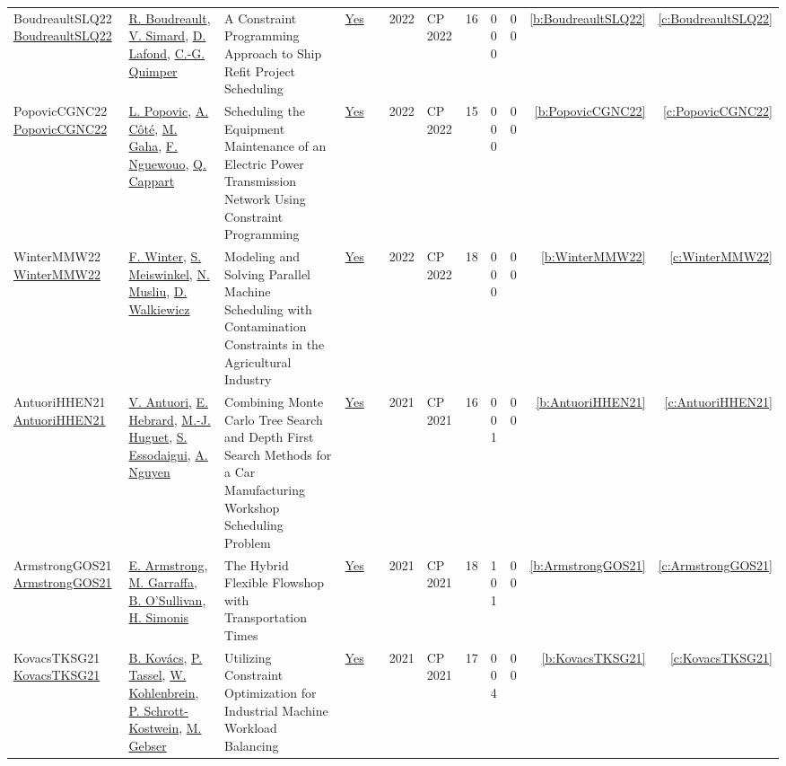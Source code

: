 {\begin{longtable}{>{\raggedright\arraybackslash}p{3cm}>{\raggedright\arraybackslash}p{4.5cm}>{\raggedright\arraybackslash}p{6.0cm}rrrp{2.5cm}rp{1cm}p{1cm}rr}
BoudreaultSLQ22 \href{https://doi.org/10.4230/LIPIcs.CP.2022.10}{BoudreaultSLQ22} & \hyperref[auth:a34]{R. Boudreault}, \hyperref[auth:a35]{V. Simard}, \hyperref[auth:a36]{D. Lafond}, \hyperref[auth:a37]{C.-G. Quimper} & A Constraint Programming Approach to Ship Refit Project Scheduling & \href{../works/BoudreaultSLQ22.pdf}{Yes} & \cite{BoudreaultSLQ22} & 2022 & CP 2022 & 16 & 0 0 0 & 0 0 & \ref{b:BoudreaultSLQ22} & \ref{c:BoudreaultSLQ22}\\
PopovicCGNC22 \href{https://doi.org/10.4230/LIPIcs.CP.2022.34}{PopovicCGNC22} & \hyperref[auth:a38]{L. Popovic}, \hyperref[auth:a39]{A. C{\^{o}}t{\'{e}}}, \hyperref[auth:a40]{M. Gaha}, \hyperref[auth:a41]{F. Nguewouo}, \hyperref[auth:a42]{Q. Cappart} & Scheduling the Equipment Maintenance of an Electric Power Transmission Network Using Constraint Programming & \href{../works/PopovicCGNC22.pdf}{Yes} & \cite{PopovicCGNC22} & 2022 & CP 2022 & 15 & 0 0 0 & 0 0 & \ref{b:PopovicCGNC22} & \ref{c:PopovicCGNC22}\\
WinterMMW22 \href{https://doi.org/10.4230/LIPIcs.CP.2022.41}{WinterMMW22} & \hyperref[auth:a43]{F. Winter}, \hyperref[auth:a44]{S. Meiswinkel}, \hyperref[auth:a45]{N. Musliu}, \hyperref[auth:a46]{D. Walkiewicz} & Modeling and Solving Parallel Machine Scheduling with Contamination Constraints in the Agricultural Industry & \href{../works/WinterMMW22.pdf}{Yes} & \cite{WinterMMW22} & 2022 & CP 2022 & 18 & 0 0 0 & 0 0 & \ref{b:WinterMMW22} & \ref{c:WinterMMW22}\\
AntuoriHHEN21 \href{https://doi.org/10.4230/LIPIcs.CP.2021.14}{AntuoriHHEN21} & \hyperref[auth:a53]{V. Antuori}, \hyperref[auth:a1]{E. Hebrard}, \hyperref[auth:a54]{M.-J. Huguet}, \hyperref[auth:a55]{S. Essodaigui}, \hyperref[auth:a56]{A. Nguyen} & Combining Monte Carlo Tree Search and Depth First Search Methods for a Car Manufacturing Workshop Scheduling Problem & \href{../works/AntuoriHHEN21.pdf}{Yes} & \cite{AntuoriHHEN21} & 2021 & CP 2021 & 16 & 0 0 1 & 0 0 & \ref{b:AntuoriHHEN21} & \ref{c:AntuoriHHEN21}\\
ArmstrongGOS21 \href{https://doi.org/10.4230/LIPIcs.CP.2021.16}{ArmstrongGOS21} & \hyperref[auth:a14]{E. Armstrong}, \hyperref[auth:a15]{M. Garraffa}, \hyperref[auth:a16]{B. O'Sullivan}, \hyperref[auth:a17]{H. Simonis} & The Hybrid Flexible Flowshop with Transportation Times & \href{../works/ArmstrongGOS21.pdf}{Yes} & \cite{ArmstrongGOS21} & 2021 & CP 2021 & 18 & 1 0 1 & 0 0 & \ref{b:ArmstrongGOS21} & \ref{c:ArmstrongGOS21}\\
KovacsTKSG21 \href{https://doi.org/10.4230/LIPIcs.CP.2021.36}{KovacsTKSG21} & \hyperref[auth:a57]{B. Kov{\'{a}}cs}, \hyperref[auth:a58]{P. Tassel}, \hyperref[auth:a59]{W. Kohlenbrein}, \hyperref[auth:a60]{P. Schrott-Kostwein}, \hyperref[auth:a61]{M. Gebser} & Utilizing Constraint Optimization for Industrial Machine Workload Balancing & \href{../works/KovacsTKSG21.pdf}{Yes} & \cite{KovacsTKSG21} & 2021 & CP 2021 & 17 & 0 0 4 & 0 0 & \ref{b:KovacsTKSG21} & \ref{c:KovacsTKSG21}\\

\end{longtable}}
